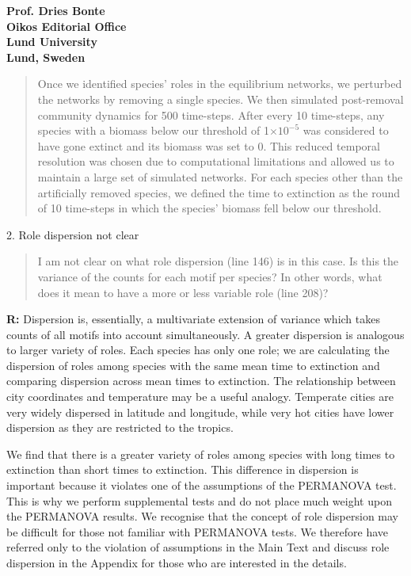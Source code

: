 \documentclass[12pt]{letter}
\begin{document}
\begin{letter}{\bf Prof. Dries Bonte\\
Oikos Editorial Office \\
Lund University \\
Lund, Sweden}
\begin{quotation}
            Once we identified species' roles in the equilibrium networks, we perturbed the networks by removing a single species. 
            We then simulated post-removal community dynamics for 500 time-steps.
            After every 10 time-steps, any species with a biomass below our threshold of 1$\times10^{-5}$ was considered to have gone extinct and its biomass was set to 0.
            This reduced temporal resolution was chosen due to computational limitations and allowed us to maintain a large set of simulated networks.
            For each species other than the artificially removed species, we defined the time to extinction as the round of 10 time-steps in which the species' biomass fell below our threshold. 

    \end{quotation}


    2. Role dispersion not clear

        \begin{quotation}
        I am not clear on what role dispersion (line 146) is in this case. Is this the variance of the counts for each motif per species? In other words, what does it mean to have a more or less variable role (line 208)?
        \end{quotation}
        
        \textbf{R:} Dispersion is, essentially, a multivariate extension of variance which takes counts of all motifs into account simultaneously.
        A greater dispersion is analogous to larger variety of roles.
        Each species has only one role; we are calculating the dispersion of roles among species with the same mean time to extinction and comparing dispersion across mean times to extinction. 
        The relationship between city coordinates and temperature may be a useful analogy. 
        Temperate cities are very widely dispersed in latitude and longitude, while very hot cities have lower dispersion as they are restricted to the tropics.
        
        
        We find that there is a greater variety of roles among species with long times to extinction than short times to extinction.        
        This difference in dispersion is important because it violates one of the assumptions of the PERMANOVA test.
        This is why we perform supplemental tests and do not place much weight upon the PERMANOVA results.
        We recognise that the concept of role dispersion may be difficult for those not familiar with PERMANOVA tests.
        We therefore have referred only to the violation of assumptions in the Main Text and discuss role dispersion in the Appendix for those who are interested in the details.



\end{letter}
\end{document}

